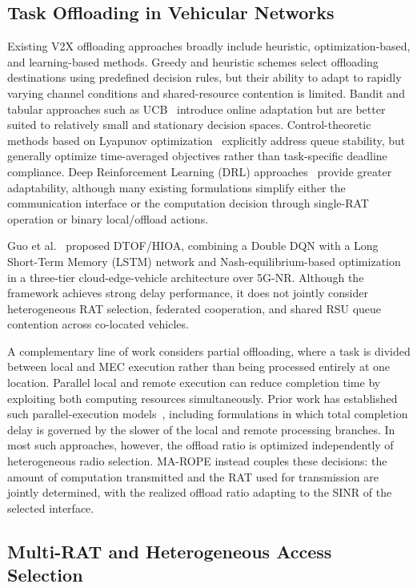 \documentclass[journal,10pt,twocolumn]{IEEEtran}
\begin{document}
\subsection{Task Offloading in Vehicular Networks}

Existing V2X offloading approaches broadly include heuristic, optimization-based, and learning-based methods. Greedy and heuristic schemes select offloading destinations using predefined decision rules, but their ability to adapt to rapidly varying channel conditions and shared-resource contention is limited. Bandit and tabular approaches such as UCB~\cite{auer2002} introduce online adaptation but are better suited to relatively small and stationary decision spaces. Control-theoretic methods based on Lyapunov optimization~\cite{mao2016} explicitly address queue stability, but generally optimize time-averaged objectives rather than task-specific deadline compliance. Deep Reinforcement Learning (DRL) approaches~\cite{xiong2021,lowe2017} provide greater adaptability, although many existing formulations simplify either the communication interface or the computation decision through single-RAT operation or binary local/offload actions.

Guo et al.~\cite{guo2026} proposed DTOF/HIOA, combining a Double DQN with a Long Short-Term Memory (LSTM) network and Nash-equilibrium-based optimization in a three-tier cloud-edge-vehicle architecture over 5G-NR. Although the framework achieves strong delay performance, it does not jointly consider heterogeneous RAT selection, federated cooperation, and shared RSU queue contention across co-located vehicles.

A complementary line of work considers partial offloading, where a task is divided between local and MEC execution rather than being processed entirely at one location. Parallel local and remote execution can reduce completion time by exploiting both computing resources simultaneously. Prior work has established such parallel-execution models~\cite{mach2017}, including formulations in which total completion delay is governed by the slower of the local and remote processing branches. In most such approaches, however, the offload ratio is optimized independently of heterogeneous radio selection. MA-ROPE instead couples these decisions: the amount of computation transmitted and the RAT used for transmission are jointly determined, with the realized offload ratio adapting to the SINR of the selected interface.

\subsection{Multi-RAT and Heterogeneous Access Selection}
\end{document}
